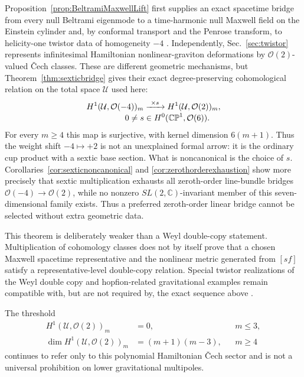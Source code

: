 \documentclass[aps,prd,reprint,nofootinbib,superscriptaddress]{revtex4-2}
\theoremstyle{definition}
\theoremstyle{remark}
\newcommand{\C}{\mathbb{C}}
\newcommand{\CP}{\mathbb{CP}}
\newcommand{\cO}{\mathcal{O}}
\newcommand{\cU}{\mathcal{U}}
\begin{document}
Proposition~\ref{prop:BeltramiMaxwellLift} first supplies an exact spacetime bridge from every null Beltrami eigenmode to a time-harmonic null Maxwell field on the Einstein cylinder and, by conformal transport and the Penrose transform, to helicity-one twistor data of homogeneity $-4$ \cite{KopinskiNatario2017,WardWells1990}.  Independently, Sec.~\ref{sec:twistor} represents infinitesimal Hamiltonian nonlinear-graviton deformations by $\cO(2)$-valued \v{C}ech classes.  These are different geometric mechanisms, but Theorem~\ref{thm:sexticbridge} gives their exact degree-preserving cohomological relation on the total space $\cU$ used here:
\begin{align}
H^1(\cU,\cO(-4))_m
&\xrightarrow{\ \times s\ }H^1(\cU,\cO(2))_m,
\label{eq:architectureSextic}\\[-1mm]
&\hspace{-8mm}0\ne s\in H^0(\CP^1,\cO(6)).\nonumber
\end{align}
For every $m\ge4$ this map is surjective, with kernel dimension $6(m+1)$.  Thus the weight shift $-4\mapsto+2$ is not an unexplained formal arrow: it is the ordinary cup product with a sextic base section.  What is noncanonical is the choice of $s$.  Corollaries~\ref{cor:sexticnoncanonical} and \ref{cor:zerothorderexhaustion} show more precisely that sextic multiplication exhausts all zeroth-order line-bundle bridges $\cO(-4)\to\cO(2)$, while no nonzero $SL(2,\C)$-invariant member of this seven-dimensional family exists.  Thus a preferred zeroth-order linear bridge cannot be selected without extra geometric data.

This theorem is deliberately weaker than a Weyl double-copy statement.  Multiplication of cohomology classes does not by itself prove that a chosen Maxwell spacetime representative and the nonlinear metric generated from $[sf]$ satisfy a representative-level double-copy relation.  Special twistor realizations of the Weyl double copy and hopfion-related gravitational examples remain compatible with, but are not required by, the exact sequence above \cite{SabharwalDalhuisen2019,White2021}.

The threshold
\begin{align}
H^1(\cU,\cO(2))_m&=0, &&m\le3,\nonumber\\
\dim H^1(\cU,\cO(2))_m&=(m+1)(m-3), &&m\ge4
\label{eq:thresholdinterpretation}
\end{align}
continues to refer only to this polynomial Hamiltonian \v{C}ech sector and is not a universal prohibition on lower gravitational multipoles.
\end{document}
